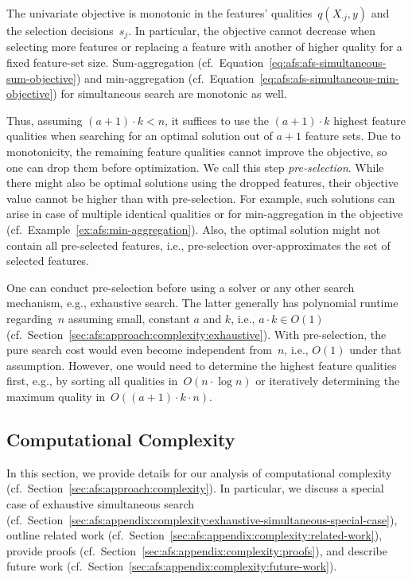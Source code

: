 \documentclass{article}
\theoremstyle{definition}
\begin{document}
The univariate objective is monotonic in the features' qualities~$q(X_{\cdot{}j},y)$ and the selection decisions~$s_j$.
In particular, the objective cannot decrease when selecting more features or replacing a feature with another of higher quality for a fixed feature-set size.
Sum-aggregation (cf.~Equation~\ref{eq:afs:afs-simultaneous-sum-objective}) and min-aggregation (cf.~Equation~\ref{eq:afs:afs-simultaneous-min-objective}) for simultaneous search are monotonic as well.

Thus, assuming $(a + 1) \cdot k < n$, it suffices to use the $(a + 1) \cdot k$ highest feature qualities when searching for an optimal solution out of $a + 1$ feature sets.
Due to monotonicity, the remaining feature qualities cannot improve the objective, so one can drop them before optimization.
We call this step \emph{pre-selection}.
While there might also be optimal solutions using the dropped features, their objective value cannot be higher than with pre-selection.
For example, such solutions can arise in case of multiple identical qualities or for min-aggregation in the objective (cf.~Example~\ref{ex:afs:min-aggregation}).
Also, the optimal solution might not contain all pre-selected features, i.e., pre-selection over-approximates the set of selected features.

One can conduct pre-selection before using a solver or any other search mechanism, e.g., exhaustive search.
The latter generally has polynomial runtime regarding~$n$ assuming small, constant $a$ and $k$, i.e., $a \cdot k \in O(1)$ (cf.~Section~\ref{sec:afs:approach:complexity:exhaustive}).
With pre-selection, the pure search cost would even become independent from~$n$, i.e., $O(1)$ under that assumption.
However, one would need to determine the highest feature qualities first, e.g., by sorting all qualities in~$O(n \cdot \log n)$ or iteratively determining the maximum quality in~$O((a+1) \cdot k \cdot n)$.

\subsection{Computational Complexity}
\label{sec:afs:appendix:complexity}

In this section, we provide details for our analysis of computational complexity (cf.~Section~\ref{sec:afs:approach:complexity}).
In particular, we discuss a special case of exhaustive simultaneous search (cf.~Section~\ref{sec:afs:appendix:complexity:exhaustive-simultaneous-special-case}), outline related work (cf.~Section~\ref{sec:afs:appendix:complexity:related-work}), provide proofs (cf.~Section~\ref{sec:afs:appendix:complexity:proofs}), and describe future work (cf.~Section~\ref{sec:afs:appendix:complexity:future-work}).
\end{document}
